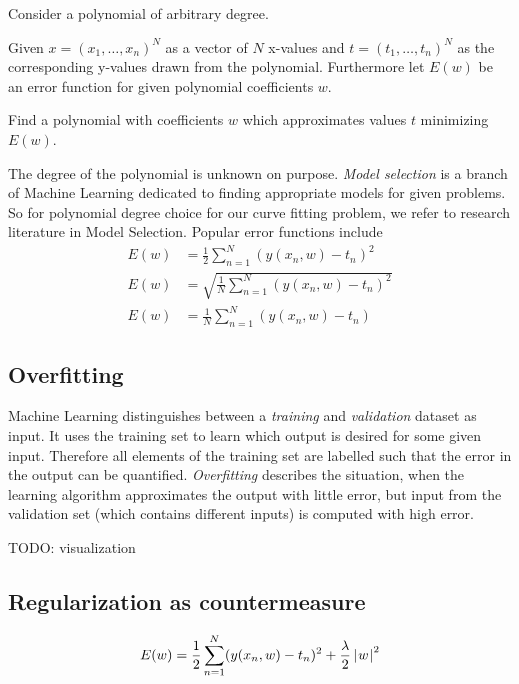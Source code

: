 \begin{problem}
  Consider a polynomial of arbitrary degree.

  \begin{description}
  \item{Given}
  $x = (x_1, \ldots, x_n)^N$ as a vector of $N$ x-values and
  $t = (t_1, \ldots, t_n)^N$ as the corresponding y-values drawn from the polynomial.
  Furthermore let $E(w)$ be an error function for given polynomial coefficients $w$.

  \item{Find}
  a polynomial with coefficients $w$ which approximates values $t$ minimizing $E(w)$.
  \end{description}
\end{problem}

The degree of the polynomial is unknown on purpose.
\emph{Model selection} is a branch of Machine Learning dedicated to finding appropriate models for given problems.
So for polynomial degree choice for our curve fitting problem, we refer to research literature in Model Selection. %
Popular error functions include
\begin{align}
  E(w) &= \frac12 \sum_{n=1}^N \left(y(x_n, w) - t_n\right)^2 \tag{Mean squared error, MSE} \\
  E(w) &= \sqrt{\frac{1}{N} \sum_{n=1}^N (y(x_n, w) - t_n)^2} \tag{Root mean square, RMS} \\
  E(w) &= \frac1N \sum_{n=1}^N (y(x_n, w) - t_n)              \tag{Mean signed deviation, MSD}
\end{align}

\subsection{Overfitting}
\label{sec:bp-overfitting}
%
Machine Learning distinguishes between a \emph{training} and \emph{validation} dataset as input.
It uses the training set to learn which output is desired for some given input.
Therefore all elements of the training set are labelled such that the error in the output can be quantified.
\emph{Overfitting} describes the situation, when the learning algorithm approximates the output with little error,
but input from the validation set (which contains different inputs) is computed with high error.

TODO: visualization

\subsection{Regularization as countermeasure}
\[ E(w) = \frac12 \sum_{n=1}^N (y(x_n, w) - t_n)^2 + \frac{\lambda}{2} \left|\hspace{0.6999pt}w\hspace{0.6999pt}\right|^2 \]

